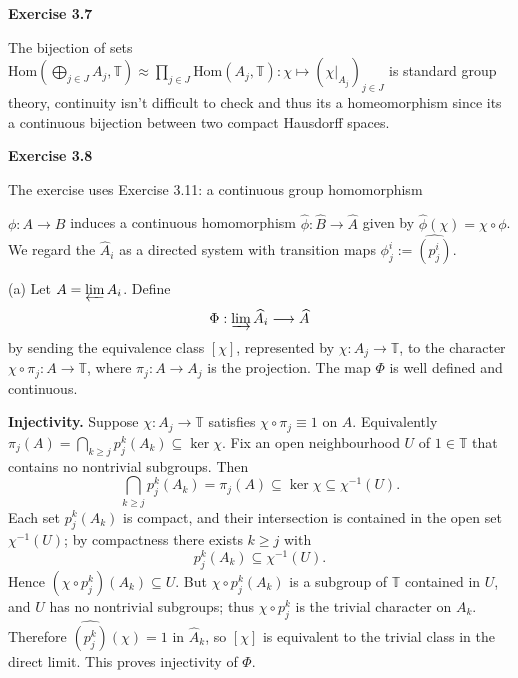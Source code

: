 \documentclass{article}
\begin{document}
\vspace{0.5cm}

\textbf{Exercise 3.7}

\vspace{0.5cm}

The bijection of sets $\text{Hom}(\bigoplus\limits_{j \in J} A_j, \mathbb T) \approx \prod\limits_{j \in J} \text{Hom}(A_j, \mathbb T): \chi \mapsto (\chi|_{A_j})_{j \in J}$ is standard group theory, continuity isn't difficult to check and thus its a homeomorphism since its a continuous bijection between two compact Hausdorff spaces.

\vspace{0.5cm}

\textbf{Exercise 3.8}

\vspace{0.5cm}

The exercise uses Exercise 3.11: a continuous group homomorphism 

$\phi:A\rightarrow B$ induces a continuous homomorphism $\widehat\phi:\widehat B\to\widehat A$ given by $\widehat\phi(\chi)=\chi\circ\phi$. We regard the $\widehat A_i$ as a directed system with transition maps $\phi_j^i:=\widehat{(p_j^i)}$.

\vspace{0.3cm}

\noindent (a) Let $A=\varprojlim A_i$. Define
\[
\Phi:\varinjlim \widehat A_i \longrightarrow \widehat A
\]
by sending the equivalence class $[\chi]$, represented by $\chi:A_j\to\mathbb T$, to the character $\chi\circ\pi_j:A\to\mathbb T$, where $\pi_j:A\to A_j$ is the projection. The map $\Phi$ is well defined and continuous.

\medskip

\noindent\textbf{Injectivity.}  Suppose $\chi:A_j\to\mathbb T$ satisfies $\chi\circ\pi_j\equiv 1$ on $A$. Equivalently $\pi_j(A)=\bigcap_{k\ge j} p_j^k(A_k)\subseteq\ker\chi$. Fix an open neighbourhood $U$ of $1\in\mathbb T$ that contains no nontrivial subgroups. Then
\[
\bigcap_{k\ge j} p_j^k(A_k)=\pi_j(A)\subseteq\ker\chi\subseteq\chi^{-1}(U).
\]
Each set $p_j^k(A_k)$ is compact, and their intersection is contained in the open set $\chi^{-1}(U)$; by compactness there exists $k\ge j$ with
\[
p_j^k(A_k)\subseteq\chi^{-1}(U).
\]
Hence $(\chi\circ p_j^k)(A_k)\subseteq U$. But $\chi\circ p_j^k(A_k)$ is a subgroup of $\mathbb T$ contained in $U$, and $U$ has no nontrivial subgroups; thus $\chi\circ p_j^k$ is the trivial character on $A_k$. Therefore $\widehat{(p_j^k)}(\chi)=1$ in $\widehat A_k$, so $[\chi]$ is equivalent to the trivial class in the direct limit. This proves injectivity of $\Phi$.
\end{document}
